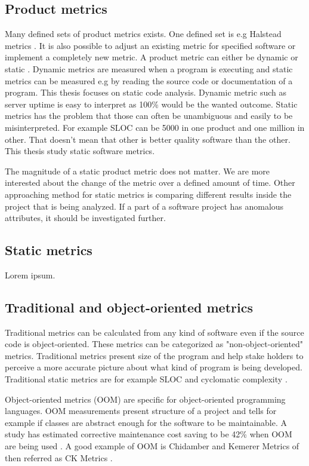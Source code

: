 \subsection{Product metrics}

Many defined sets of product metrics exists. One defined set is e.g Halstead metrics \cite{al2005analysis}. It is also possible to adjust an existing metric for specified software or implement a completely new metric. A product metric can either be dynamic or static \cite{sommerville2011software}. Dynamic metrics are measured when a program is executing and static metrics can be measured e.g by reading the source code or documentation of a program. This thesis focuses on static code analysis. Dynamic metric such as server uptime is easy to interpret as 100\% would be the wanted outcome. Static metrics has the problem that those can often be unambiguous and easily to be misinterpreted. For example SLOC can be 5000 in one product and one million in other. That doesn't mean that other is better quality software than the other. This thesis study static software metrics.

The magnitude of a static product metric does not matter. We are more interested about the change of the metric over a defined amount of time. Other approaching method for static metrics is comparing different results inside the project that is being analyzed. If a part of a software project has anomalous attributes, it should be investigated further. 

\subsection{Static metrics}

Lorem ipsum.

\subsection{Traditional and object-oriented metrics}

Traditional metrics can be calculated from any kind of software even if the source code is object-oriented. These metrics can be categorized as "non-object-oriented" metrics. Traditional metrics present size of the program and help stake holders to perceive a more accurate picture about what kind of program is being developed. Traditional static metrics are for example SLOC and cyclomatic complexity \cite{fenton1997software}.  

Object-oriented metrics (OOM) are specific for object-oriented programming languages. OOM measurements present structure of a project and tells for example if classes are abstract enough for the software to be maintainable. A study has estimated corrective maintenance cost saving to be 42\% when OOM are being used \cite{sarker2005overview}. A good example of OOM is Chidamber and Kemerer Metrics of then referred as CK Metrics \cite{chidamber1994metrics}.

